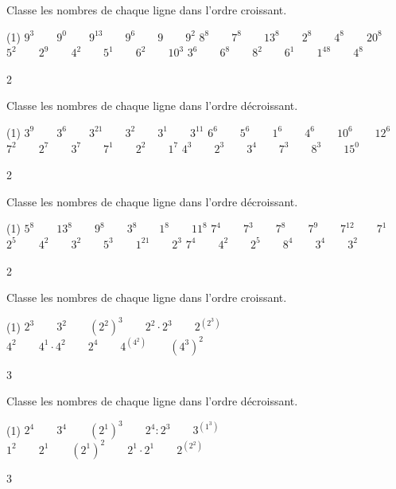 \documentclass[a4paper,11pt]{report}
\begin{document}
\begin{exo}{
Classe les nombres de chaque ligne dans l'ordre croissant.

\begin{tasks}(1)
    \task $9^3\qquad9^0\qquad9^{13}\qquad9^6\qquad9\qquad9^2$
    \task $8^8\qquad7^8\qquad13^8\qquad2^8\qquad4^8\qquad20^8$
    \task $5^2\qquad2^{9}\qquad4^2\qquad5^1\qquad6^2\qquad10^3$
    \task $3^6\qquad6^8\qquad8^2\qquad6^1\qquad1^{48}\qquad4^8$
\end{tasks}
}{2}
\end{exo}



\begin{exo}{
Classe les nombres de chaque ligne dans l'ordre décroissant.

\begin{tasks}(1)
    \task $3^9\qquad3^6\qquad3^{21}\qquad3^2\qquad3^1\qquad3^{11}$
    \task $6^6\qquad5^6\qquad1^6\qquad4^6\qquad10^6\qquad12^6$
    \task $7^2\qquad2^7\qquad3^7\qquad7^1\qquad2^2\qquad1^7$
    \task $4^3\qquad2^3\qquad3^4\qquad7^3\qquad8^3\qquad15^0$
\end{tasks}
}{2}
\end{exo}


\begin{exo}{
Classe les nombres de chaque ligne dans l'ordre décroissant.

\begin{tasks}(1)
    \task $5^8\qquad13^8\qquad9^8\qquad3^8\qquad1^8\qquad11^8$
    \task $7^4\qquad7^3\qquad7^8\qquad7^9\qquad7^{12}\qquad7^1$
    \task $2^5\qquad4^2\qquad3^2\qquad5^3\qquad1^{21}\qquad2^3$
    \task $7^4\qquad4^2\qquad2^5\qquad8^4\qquad3^4\qquad3^2$
\end{tasks}
}{2}
\end{exo}


\begin{exo}{
Classe les nombres de chaque ligne dans l'ordre croissant.

\begin{tasks}(1)
    \task $2^3\qquad3^2\qquad{(2^2)}^3\qquad2^2\cdot2^3\qquad2^{(2^3)}$
    \task $4^2\qquad4^1\cdot4^2\qquad2^4\qquad4^{(4^2)}\qquad{(4^3)}^2$
\end{tasks}
}{3}
\end{exo}



\begin{exo}{
Classe les nombres de chaque ligne dans l'ordre décroissant.
\begin{tasks}(1)
    \task $2^4\qquad3^4\qquad{(2^1)}^3\qquad2^4:2^3\qquad3^{(1^3)}$
    \task $1^2\qquad2^1\qquad{(2^1)}^2\qquad2^1\cdot2^1\qquad2^{(2^2)}$
\end{tasks}
}{3}
\end{exo}
\end{document}

